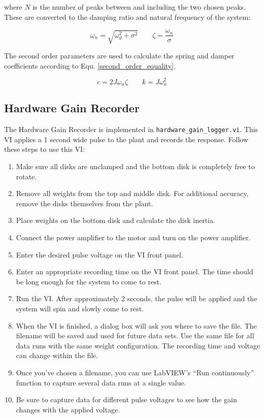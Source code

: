 where $N$ is the number of peaks between and including the two chosen
peaks.  These are converted to the damping ratio and natural frequency
of the system:

\begin{equation}
\omega_n = \sqrt{ \omega_d^2 + \sigma^2} \qquad
\zeta = \frac{\omega_n}{\sigma}
\end{equation}

The second order parameters are used to calculate the spring and
damper coefficients according to
Equ. \ref{second_order_equality}.

\begin{equation} 
c = 2 J \omega_n \zeta
\qquad
k = J \omega_n^2 
\end{equation}

\subsection{Hardware Gain Recorder}

The Hardware Gain Recorder is implemented in
\texttt{hardware\_gain\_logger.vi}.  This VI applies a 1 second wide
pulse to the plant and records the response.  Follow these steps to
use this VI:

\begin{enumerate}
    \item Make sure all disks are unclamped and the bottom disk is
       completely free to rotate.
    \item Remove all weights from the top and middle disk.  For
       additional accuracy, remove the disks themselves from the plant.
    \item Place weights on the bottom disk and calculate the disk
       inertia.
    \item Connect the power amplifier to the motor and turn on the
       power amplifier.
    \item Enter the desired pulse voltage on the VI front panel.
    \item Enter an appropriate recording time on the VI front panel.
       The time should be long enough for the system to come to rest.
    \item Run the VI.  After approximately 2 seconds, the pulse will
       be applied and the system will spin and slowly come to rest.  
    \item When the VI is finished, a dialog box will ask you where to
       save the file.  The filename will be saved and used for future
       data sets.  Use the same file for all data runs with the same
       weight configuration.  The recording time and voltage can
       change within the file.
    \item Once you've chosen a filename, you can use LabVIEW's ``Run
       continuously'' function to capture several data runs at a single
       value.
    \item Be sure to capture data for different pulse voltages to see
       how the gain changes with the applied voltage.
\end{enumerate}

